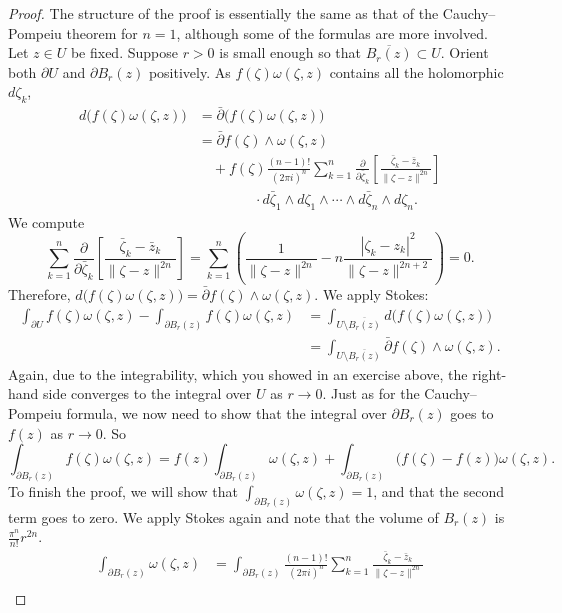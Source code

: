 \documentclass[UTF8,11pt]{ctexart}
\theoremstyle{definition}
\begin{document}
\begin{proof}
The structure of the proof is essentially the same as that of the Cauchy--Pompeiu theorem for $n=1$, although some of the formulas are more involved. Let $z\in U$ be fixed. Suppose $r>0$ is small enough so that $\overline{B_r(z)}\subset U$. Orient both $\partial U$ and $\partial B_r(z)$ positively. As $f(\zeta)\omega(\zeta,z)$ contains all the holomorphic $d\zeta_k$,
\begin{align*}
d\bigl(f(\zeta)\omega(\zeta,z)\bigr)&=\bar\partial\bigl(f(\zeta)\omega(\zeta,z)\bigr)\\
&=\bar\partial f(\zeta)\wedge\omega(\zeta,z)\\
&\quad+f(\zeta)\frac{(n-1)!}{(2\pi i)^n}\sum_{k=1}^n\frac{\partial}{\partial\bar\zeta_k}\left[\frac{\bar\zeta_k-\bar z_k}{\|\zeta-z\|^{2n}}\right]\\
&\qquad\qquad\cdot d\bar\zeta_1\wedge d\zeta_1\wedge\cdots\wedge d\bar\zeta_n\wedge d\zeta_n.
\end{align*}
We compute
\[
\sum_{k=1}^n\frac{\partial}{\partial\bar\zeta_k}\left[\frac{\bar\zeta_k-\bar z_k}{\|\zeta-z\|^{2n}}\right]=\sum_{k=1}^n\left(\frac1{\|\zeta-z\|^{2n}}-n\frac{|\zeta_k-z_k|^2}{\|\zeta-z\|^{2n+2}}\right)=0.
\]
Therefore, $d\bigl(f(\zeta)\omega(\zeta,z)\bigr)=\bar\partial f(\zeta)\wedge\omega(\zeta,z)$. We apply Stokes:
\begin{align*}
\int_{\partial U}f(\zeta)\omega(\zeta,z)-\int_{\partial B_r(z)}f(\zeta)\omega(\zeta,z)
&=\int_{U\setminus\overline{B_r(z)}}d\bigl(f(\zeta)\omega(\zeta,z)\bigr)\\
&=\int_{U\setminus\overline{B_r(z)}}\bar\partial f(\zeta)\wedge\omega(\zeta,z).
\end{align*}
Again, due to the integrability, which you showed in an exercise above, the right-hand side converges to the integral over $U$ as $r\to0$. Just as for the Cauchy--Pompeiu formula, we now need to show that the integral over $\partial B_r(z)$ goes to $f(z)$ as $r\to0$. So
\[
\int_{\partial B_r(z)}f(\zeta)\omega(\zeta,z)=f(z)\int_{\partial B_r(z)}\omega(\zeta,z)+\int_{\partial B_r(z)}\bigl(f(\zeta)-f(z)\bigr)\omega(\zeta,z).
\]
To finish the proof, we will show that $\int_{\partial B_r(z)}\omega(\zeta,z)=1$, and that the second term goes to zero. We apply Stokes again and note that the volume of $B_r(z)$ is $\frac{\pi^n}{n!}r^{2n}$.
\begin{align*}
\int_{\partial B_r(z)}\omega(\zeta,z)
&=\int_{\partial B_r(z)}\frac{(n-1)!}{(2\pi i)^n}\sum_{k=1}^n\frac{\bar\zeta_k-\bar z_k}{\|\zeta-z\|^{2n}}\\

\end{align*}
\end{proof}
\end{document}
